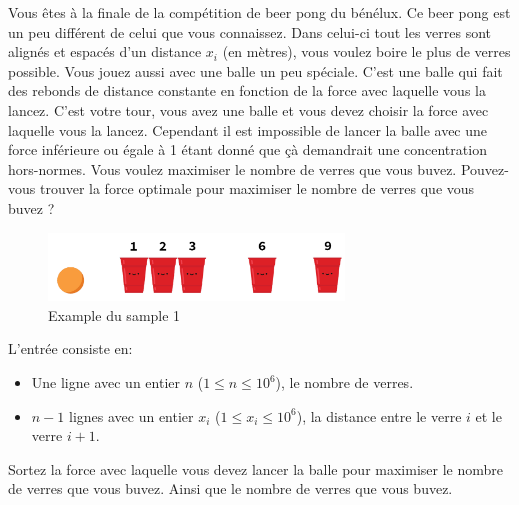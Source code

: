 \problemname{\problemyamlname}


\newcommand{\maxn}{10^{6}}

Vous êtes à la finale de la compétition de beer pong du bénélux. Ce beer pong est un peu différent de celui que vous connaissez. Dans celui-ci tout les verres sont alignés et espacés d'un distance $x_i$ (en mètres), vous voulez boire le plus de verres possible. Vous jouez aussi avec une balle un peu spéciale. C'est une balle qui fait des rebonds de distance constante en fonction de la force avec laquelle vous la lancez.
C'est votre tour, vous avez une balle et vous devez choisir la force avec laquelle vous la lancez. Cependant il est impossible de lancer la balle avec une force inférieure ou égale à 1 étant donné que çà demandrait une concentration hors-normes. Vous voulez maximiser le nombre de verres que vous buvez. Pouvez-vous trouver la force optimale pour maximiser le nombre de verres que vous buvez ?
\smallskip
\begin{figure}[h]
    \centering
    \includegraphics[width=0.7\textwidth]{illustration.png}
    \caption{Example du sample 1}
\end{figure}

\begin{Input}
    L'entrée consiste en:
    \begin{itemize}
        \item Une ligne avec un entier  $n$ ($1\leq n\leq \maxn$), le nombre de verres.
        \item $n-1$ lignes avec un entier $x_i$ ($1\leq x_i\leq \maxn$), la distance entre le verre $i$ et le verre $i+1$.
    \end{itemize}
\end{Input}

\begin{Output}
    Sortez la force avec laquelle vous devez lancer la balle pour maximiser le nombre de verres que vous buvez. Ainsi que le nombre de verres que vous buvez.
\end{Output}
